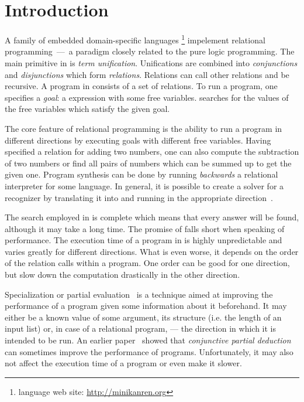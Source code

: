 \section{Introduction}

A family of embedded domain-specific languages \mk\footnote{\mk language web site: \url{http://minikanren.org}} impelement relational programming~---~a paradigm closely related to the pure logic programming.
The main primitive in \mk is \emph{term unification}.
Unifications are combined into \emph{conjunctions} and \emph{disjunctions} which form \emph{relations}.
Relations can call other relations and be recursive.
A program in \mk consists of a set of relations.
To run a \mk program, one specifies a \emph{goal}: a \mk expression with some free variables.
\mk searches for the values of the free variables which satisfy the given goal.

The core feature of relational programming is the ability to run a program in different directions by executing goals with different free variables.
Having specified a relation for adding two numbers, one can also compute the subtraction of two numbers or find all pairs of numbers which can be summed up to get the given one.
Program synthesis can be done by running \emph{backwards} a relational interpreter for some language.
In general, it is possible to create a solver for a recognizer by translating it into \mk and running in the appropriate direction~\cite{lozov2019relational}.

The search employed in \mk is complete which means that every answer will be found, although it may take a long time.
The promise of \mk falls short when speaking of performance.
The execution time of a program in \mk is highly unpredictable and varies greatly for different directions.
What is even worse, it depends on the order of the relation calls within a program.
One order can be good for one direction, but slow down the computation drastically in the other direction.

Specialization or partial evaluation~\cite{jonesbook} is a technique aimed at improving the performance of a program given some information about it beforehand.
It may either be a known value of some argument, its structure (i.e. the length of an input list) or, in case of a relational program, --- the direction in which it is intended to be run.
An earlier paper~\cite{lozov2019relational} showed that \emph{conjunctive partial deduction}~\cite{de1999conjunctive} can sometimes improve the performance of \mk programs.
Unfortunately, it may also not affect the execution time of a program or even make it slower.


